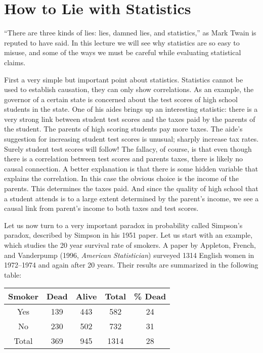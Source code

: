 \documentclass[11pt,fleqn]{article}
\begin{document}
\maketitle

\section*{How to Lie with Statistics}

``There are three kinds of lies: lies, damned lies, and 
statistics,'' as Mark Twain is reputed to have said. 
In this lecture we will see why 
statistics are so easy to misuse, and some of the ways 
we must be careful while evaluating statistical claims. 

First a very simple but important point about statistics.
Statistics cannot be used to establish causation,
they can only show correlations. As an example, the 
governor of a certain state is concerned about the 
test scores of high school students in the state. 
One of his aides brings up an interesting statistic:
there is a very strong link between student test scores
and the taxes paid by the parents of the student. 
The parents of high scoring students pay more taxes. 
The aide's suggestion for increasing student test 
scores is unusual; sharply increase tax rates. Surely
student test scores will follow! The fallacy, of 
course, is that even though there is a correlation 
between test scores and parents taxes, there is likely 
no causal connection. A better explanation is that there
is some hidden variable that explains the correlation. 
In this case the obvious choice is the income of the 
parents. This determines the taxes paid. And since 
the quality of high school that a student attends is 
to a large extent determined by the parent's income,
we see a causal link from parent's income to both 
taxes and test scores. 

Let us now turn to a very important paradox in 
probability called Simpson's paradox, described by
Simpson in his 1951 paper. Let us start with an example, 
which studies the 20 year survival rate of smokers.
A paper by Appleton, French, and Vanderpump
(1996, \emph{American Statistician}) surveyed 1314 English women in
1972--1974 and again after 20 years. Their results are summarized
in the following table:

\begin{center}
\begin{tabular}{|c|c|c|c|c|}
  \hline
  Smoker & Dead & Alive & Total & \% Dead \\ \hline
  Yes & 139 & 443 & 582 & 24 \\
  No & 230 & 502 & 732 & 31 \\\hline
  Total & 369 & 945 & 1314 & 28 \\
  \hline
\end{tabular}
\end{center}
\end{document}
